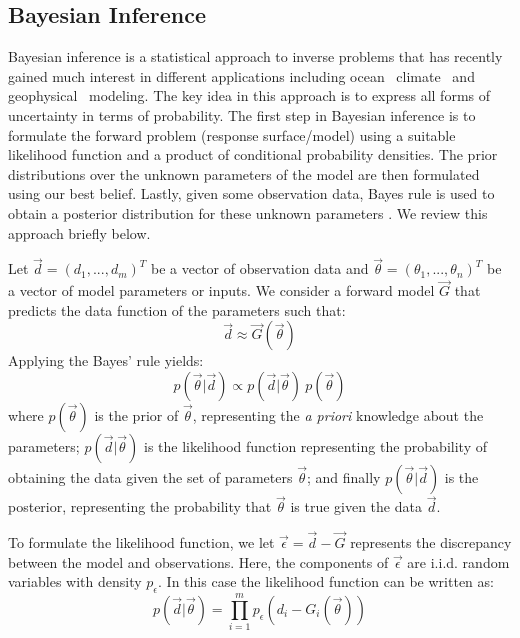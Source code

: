 \subsection{Bayesian Inference}
 \label{sec:inference}
 
Bayesian inference is a statistical approach to inverse problems
that has recently gained much interest in different applications including
ocean~\citep{Alexanderian2011a,Zedler2012,sraj:2013a}
climate~\citep{OlsonEtAl2012} and geophysical~\citep{Malinverno2002} modeling.
The key idea in this approach is to express all forms of uncertainty
in terms of probability. The first step in Bayesian inference 
is to formulate the forward problem (response surface/model) using 
a suitable likelihood function and a product of conditional probability densities. 
The prior distributions over the unknown parameters of the model
are then formulated using our best belief. Lastly, given some observation data, Bayes rule 
is used to obtain a posterior distribution for these unknown parameters
\citep{sivia}. We review this approach briefly below.

Let $\vec{d}=(d_1,...,d_m)^T$ be a vector of observation data and $\vec{\theta}=(\theta_1,...,\theta_n)^T$ be a vector of model parameters or inputs. We consider a forward model $\vec G$ that predicts the data function of 
the parameters such that:
\begin{equation}
\vec d \approx \vec{G}( \vec \theta)
\end{equation}
Applying the Bayes' rule yields:
\begin{equation}
 p(\vec{\theta}| \vec d) \propto 
 p(\vec d | \vec{\theta}) \ p(\vec{\theta})  
\label{eq:bayes}
\end{equation}
where $p(\vec{\theta})$ is the prior of $\vec{\theta}$, representing the \emph{a priori} knowledge
about the parameters; 
$p(\vec d| \vec{\theta})$ is the likelihood function representing
the probability of obtaining the data given the set of parameters $\vec{\theta}$;
and finally $p(\vec{\theta}| \vec d)$ is the posterior,
representing the probability that $\vec{\theta}$ is true given the data $\vec d $.

To formulate the likelihood function, we let $\vec \epsilon = \vec d - \vec{G}$
represents the discrepancy between the model and observations.
Here, the components of $\vec \epsilon $ are i.i.d. random variables with density $p_{\epsilon}$.
In this case the likelihood function can be written as:
\begin{equation} 
p(\vec d |  \vec{\theta}) 
= 
\prod_{i=1}^m  
p_\epsilon (d_i - G_i(\vec \theta))  	
\label{eq:likelihood}
\end{equation}

